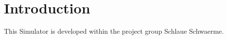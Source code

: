 \hypertarget{main_intro_sec}{}\section{Introduction}\label{main_intro_sec}
This Simulator is developed within the project group Schlaue Schwaerme. 